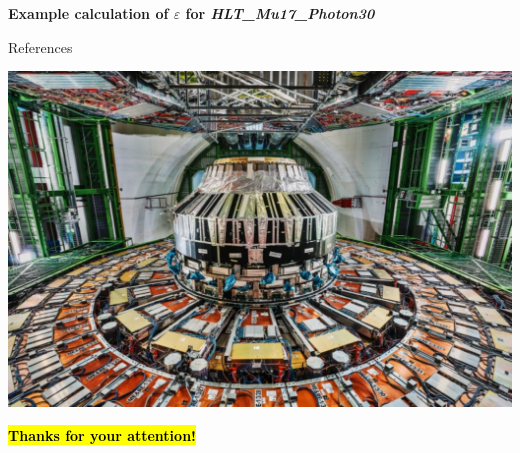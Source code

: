 \documentclass[aspectratio = 1610, xcolor = dvipsnames]{beamer}
\makeatletter
\let\HL\hl
\renewcommand\hl{%
  \let\set@color\beamerorig@set@color
  \let\reset@color\beamerorig@reset@color
  \HL}
\makeatother
\begin{document}
	
        \begin{frame}[t]{\bf Example calculation of $\varepsilon$ for {\it HLT\_Mu17\_Photon30}}

        \end{frame}
	
	
	
	
	
	
	
	
	
	
	
	
	
	
	
	
	
	
	
	
	
	
	
	
	
	
	
	
	
    
	\begin{frame}{References}
		\footnotesize{\printbibliography}
	\end{frame}
	
	
	{\usebackgroundtemplate
    {\includegraphics[width=\paperwidth,height=\paperheight]{images/CMS-wallpaper2.pdf}}
	\begin{frame}
    	\thispagestyle{empty}
    	\vspace{-3.cm}
    	\begin{center}
            {\bf\Huge{\textcolor{unipd}{\hl{Thanks for your attention!}}}}
        \end{center}
	\end{frame}}
	
    
\end{document}
